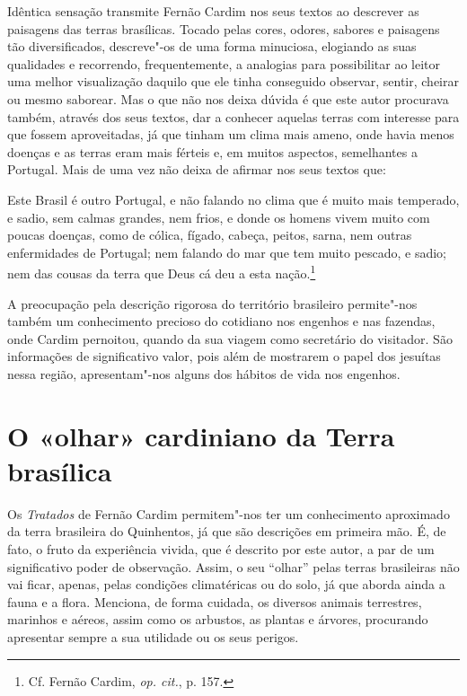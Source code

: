 Idêntica sensação transmite Fernão Cardim nos seus textos ao
descrever as paisagens das terras brasílicas. Tocado pelas cores,
odores, sabores e paisagens tão diversificados, descreve"-os de uma
forma minuciosa, elogiando as suas qualidades e recorrendo,
frequentemente, a analogias para possibilitar ao leitor uma melhor
visualização daquilo que ele tinha conseguido observar, sentir, cheirar
ou mesmo saborear. Mas o que não nos deixa dúvida é que este autor
procurava também, através dos seus textos, dar a conhecer aquelas
terras com interesse para que fossem aproveitadas, já que tinham um clima
mais ameno, onde havia menos doenças e as terras eram mais férteis e,
em muitos aspectos, semelhantes a Portugal. Mais de uma vez não deixa
de afirmar nos seus textos que:

\begin{hedraquote} 
Este Brasil é outro Portugal, e não falando no clima que é
muito mais temperado, e sadio, sem calmas grandes, nem frios, e donde
os homens vivem muito com poucas doenças, como de cólica, fígado,
cabeça, peitos, sarna, nem outras enfermidades de Portugal; nem falando
do mar que tem muito pescado, e sadio; nem das cousas da terra que Deus
cá deu a esta nação.\footnote{ Cf. Fernão Cardim, \textit{op. cit.}, p. 157.} 
\end{hedraquote}

 A preocupação pela descrição rigorosa do território
brasileiro permite"-nos também um conhecimento precioso do cotidiano
nos engenhos e nas fazendas, onde Cardim pernoitou, quando da sua
viagem como secretário do visitador. São informações de significativo
valor, pois além de mostrarem o papel dos jesuítas nessa região,
apresentam"-nos alguns dos hábitos de vida nos engenhos.

\section{O «olhar» cardiniano da Terra brasílica}

 Os \textit{Tratados} de Fernão Cardim permitem"-nos ter um
conhecimento aproximado da terra brasileira do Quinhentos, já que são
descrições em primeira mão. É, de fato, o fruto da experiência vivida,
que é descrito por este autor, a par de um significativo poder de
observação. Assim, o seu ``olhar'' pelas terras brasileiras não vai
ficar, apenas, pelas condições climatéricas ou do solo, já que aborda
ainda a fauna e a flora. Menciona, de forma cuidada, os diversos
animais terrestres, marinhos e aéreos, assim como os arbustos, as
plantas e árvores, procurando apresentar sempre a sua utilidade ou os seus perigos.

